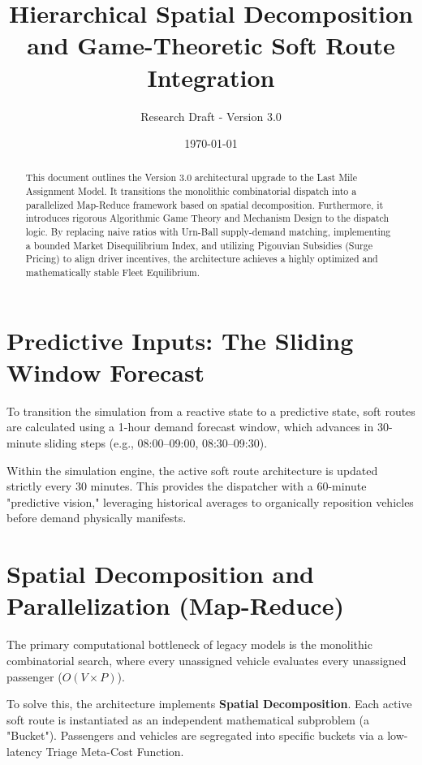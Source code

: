 \documentclass[12pt,a4paper]{article}
\title{\textbf{Hierarchical Spatial Decomposition and Game-Theoretic Soft Route Integration}}
\author{Research Draft - Version 3.0}
\date{\today}
\begin{document}
\maketitle

\begin{abstract}
This document outlines the Version 3.0 architectural upgrade to the Last Mile Assignment Model. It transitions the monolithic combinatorial dispatch into a parallelized Map-Reduce framework based on spatial decomposition. Furthermore, it introduces rigorous Algorithmic Game Theory and Mechanism Design to the dispatch logic. By replacing naive ratios with Urn-Ball supply-demand matching, implementing a bounded Market Disequilibrium Index, and utilizing Pigouvian Subsidies (Surge Pricing) to align driver incentives, the architecture achieves a highly optimized and mathematically stable Fleet Equilibrium.
\end{abstract}

\section{Predictive Inputs: The Sliding Window Forecast}
To transition the simulation from a reactive state to a predictive state, soft routes are calculated using a 1-hour demand forecast window, which advances in 30-minute sliding steps (e.g., 08:00--09:00, 08:30--09:30). 

Within the simulation engine, the active soft route architecture is updated strictly every 30 minutes. This provides the dispatcher with a 60-minute "predictive vision," leveraging historical averages to organically reposition vehicles before demand physically manifests.

\section{Spatial Decomposition and Parallelization (Map-Reduce)}
The primary computational bottleneck of legacy models is the monolithic combinatorial search, where every unassigned vehicle evaluates every unassigned passenger ($O(V \times P)$). 

To solve this, the architecture implements \textbf{Spatial Decomposition}. Each active soft route is instantiated as an independent mathematical subproblem (a "Bucket"). Passengers and vehicles are segregated into specific buckets via a low-latency Triage Meta-Cost Function. 
\end{document}
